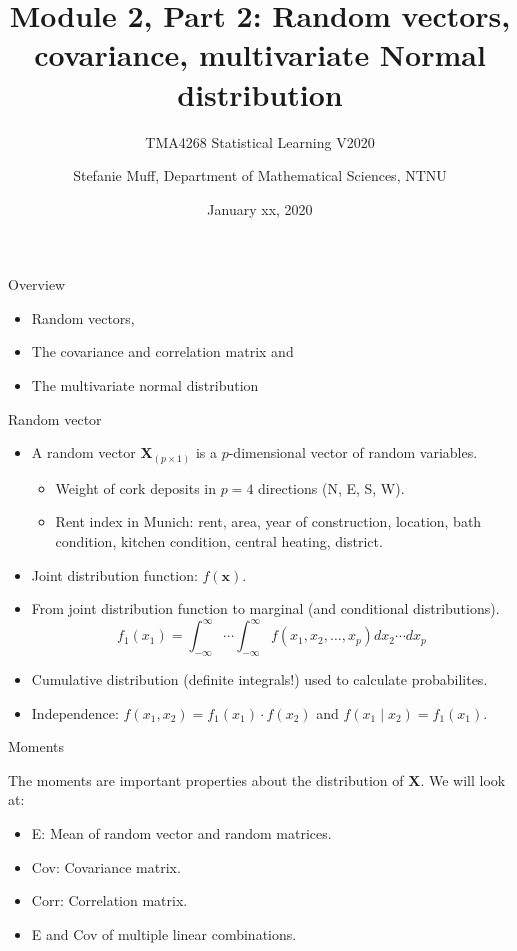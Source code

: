 \documentclass[ignorenonframetext,]{beamer}
\title{Module 2, Part 2: Random vectors, covariance, multivariate Normal
distribution}
\subtitle{TMA4268 Statistical Learning V2020}
\author{Stefanie Muff, Department of Mathematical Sciences, NTNU}
\date{January xx, 2020}
\providecommand{\tightlist}{%
  \setlength{\itemsep}{0pt}\setlength{\parskip}{0pt}}
\begin{document}
\frame{\titlepage}

\begin{frame}{Overview}

\normalsize

\begin{itemize}
\item
  Random vectors,
\item
  The covariance and correlation matrix and
\item
  The multivariate normal distribution
\end{itemize}

\end{frame}

\begin{frame}{Random vector}

\begin{itemize}
\tightlist
\item
  A random vector \(\mathbf{X}_{(p\times 1)}\) is a \(p\)-dimensional
  vector of random variables.

  \begin{itemize}
  \tightlist
  \item
    Weight of cork deposits in \(p=4\) directions (N, E, S, W).
  \item
    Rent index in Munich: rent, area, year of construction, location,
    bath condition, kitchen condition, central heating, district.
  \end{itemize}
\item
  Joint distribution function: \(f(\mathbf{x})\).
\item
  From joint distribution function to marginal (and conditional
  distributions).
  \[f_1(x_1)=\int_{-\infty}^{\infty}\cdots \int_{-\infty}^{\infty} f(x_1,x_2,\ldots,x_p)dx_2 \cdots dx_p\]
\item
  Cumulative distribution (definite integrals!) used to calculate
  probabilites.
\item
  Independence: \(f(x_1,x_2)=f_1(x_1)\cdot f(x_2)\) and
  \(f(x_1\mid x_2)=f_1(x_1).\)
\end{itemize}

\end{frame}

\begin{frame}

\begin{block}{Moments}

\vspace{2mm}

The moments are important properties about the distribution of
\(\mathbf{X}\). We will look at:

\begin{itemize}
\tightlist
\item
  E: Mean of random vector and random matrices.
\item
  Cov: Covariance matrix.
\item
  Corr: Correlation matrix.
\item
  E and Cov of multiple linear combinations.
\end{itemize}

\end{block}

\end{frame}
\end{document}
